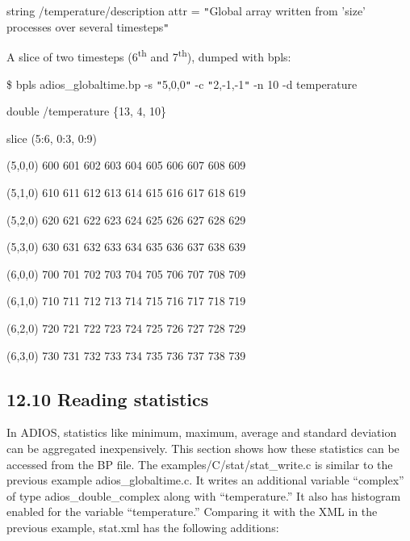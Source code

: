 \vspace{10pt}
string     /temperature/description  attr   = \texttt{"}Global array written from 
'size' processes over several timesteps\texttt{"}\label{HToc84890304}\label{HToc212016679}\label{HToc212016921}

\vspace{23pt}
\parindent=0pt
A slice of two timesteps (6\textsuperscript{th} and 7\textsuperscript{th}), dumped 
with bpls:

\vspace{10pt}
\$ bpls adios\_globaltime.bp -s \texttt{"}5,0,0\texttt{"} -c \texttt{"}2,-1,-1\texttt{"} 
-n 10 -d temperature

\vspace{10pt}
\parindent=7pt
double     /temperature  \{13, 4, 10\}

\vspace{10pt}
\parindent=14pt
slice (5:6, 0:3, 0:9)

\vspace{23pt}
\parindent=0pt
(5,0,0)    600 601 602 603 604 605 606 607 608 609

\vspace{10pt}
\parindent=14pt
(5,1,0)    610 611 612 613 614 615 616 617 618 619

\vspace{10pt}
(5,2,0)    620 621 622 623 624 625 626 627 628 629

\vspace{10pt}
\parindent=28pt
(5,3,0)    630 631 632 633 634 635 636 637 638 639

\vspace{10pt}
\parindent=14pt
(6,0,0)    700 701 702 703 704 705 706 707 708 709

\vspace{10pt}
(6,1,0)    710 711 712 713 714 715 716 717 718 719

\vspace{10pt}
\parindent=28pt
(6,2,0)    720 721 722 723 724 725 726 727 728 729

\vspace{10pt}
\parindent=14pt
(6,3,0)    730 731 732 733 734 735 736 737 738 739 \label{HToc182553451}

\vspace{23pt}
\subsection*{{\large 12.10 }{\large \textbf{Reading statistics}}}

\vspace{10pt}
\parindent=0pt
In ADIOS, statistics like minimum, maximum, average and standard deviation can 
be aggregated inexpensively. This section shows how these statistics can be accessed 
from the BP file. The examples/C/stat/stat\_write.c is similar to the previous 
example adios\_globaltime.c. It writes an additional variable ``complex'' of type 
adios\_double\_complex along with ``temperature.''  It also has histogram enabled 
for the variable ``temperature.''  Comparing it with the XML in the previous example, 
stat.xml has the following additions:

